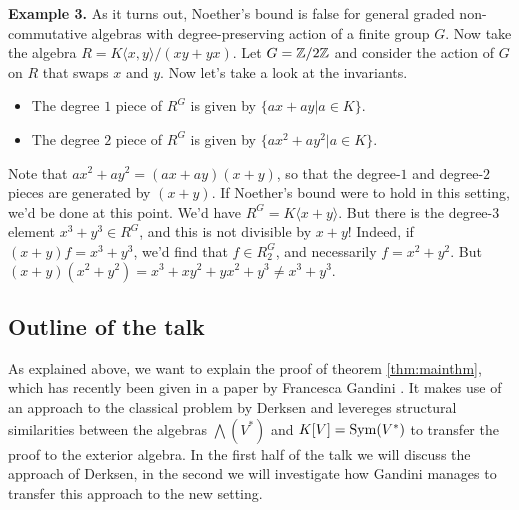 \documentclass[../main.tex]{subfiles}
\begin{document}
\textbf{Example 3.} 
As it turns out, Noether's bound is false for general graded non-commutative algebras
with degree-preserving action of a finite group $G$.
Now take the algebra $R = K\langle x,y \rangle/(xy+yx)$.
Let $G = \mathbb{Z}/2\mathbb{Z}$ and consider the action of $G$ on $R$ that swaps $x$ and $y$. Now let's
take a look at the invariants. 
\begin{itemize}
    \item The degree $1$ piece of $R^G$ is given by $\{ax + ay | a \in K\}$.
    \item The degree $2$ piece of $R^G$ is given by $\{ax^2 + ay^2 | a \in K\}$.
\end{itemize}
Note that $ax^2 + ay^2 = (ax+ay)(x+y)$, so that the degree-$1$ and degree-$2$ pieces
are generated by $(x+y)$. If Noether's bound were to hold in this setting, we'd
be done at this point. We'd have $R^G = K\langle x+y \rangle$. But there is the
degree-$3$ element $x^3+y^3 \in R^G$, and this is not divisible by $x+y$!
Indeed, if $(x+y)f = x^3 +y^3$, we'd find that $f \in R^G_2$, and necessarily
$f = x^2 + y^2$. But $(x+y)(x^2 + y^2) = x^3 + xy^2 + yx^2 + y^3 \neq x^3 + y^3.$

\subsection{Outline of the talk} %
\label{sub:Outline of the talk}
As explained above, we want to explain the proof of theorem \ref{thm:mainthm},
which has recently been given in a paper by Francesca Gandini 
\cite{gandini2021degree}. It makes use of an approach to the classical 
problem by Derksen and levereges structural similarities between the algebras
$\bigwedge(V^*)$ and $K[V] = \operatorname{Sym}(V^*)$ to transfer the proof to the 
exterior algebra. In the first half of the talk we will discuss 
the approach of Derksen, in the second we will investigate how Gandini manages
to transfer this approach to the new setting.
\end{document}

